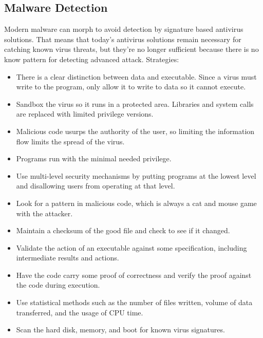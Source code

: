 \documentclass{math}
\begin{document}
\subsection*{Malware Detection}
Modern malware can morph to avoid detection by signature based antivirus
solutions. That means that today's antivirus solutions remain necessary for
catching known virus threats, but they're no longer sufficient because there is
no know pattern for detecting advanced attack. Strategies:
\begin{itemize}
  \item There is a clear distinction between data and executable. Since a virus
    must write to the program, only allow it to write to data so it cannot
    execute.
  \item Sandbox the virus so it runs in a protected area. Libraries and system
    calls are replaced with limited privilege versions.
  \item Malicious code usurps the authority of the user, so limiting the
    information flow limits the spread of the virus.
  \item Programs run with the minimal needed privilege.
  \item Use multi-level security mechanisms by putting programs at the lowest
    level and disallowing users from operating at that level.
  \item Look for a pattern in malicious code, which is always a cat and mouse
    game with the attacker.
  \item Maintain a checksum of the good file and check to see if it changed.
  \item Validate the action of an executable against some specification,
    including intermediate results and actions.
  \item Have the code carry some proof of correctness and verify the proof
    against the code during execution.
  \item Use statistical methods such as the number of files written, volume of
    data transferred, and the usage of CPU time.
  \item Scan the hard disk, memory, and boot for known virus signatures.
\end{itemize}
\end{document}

